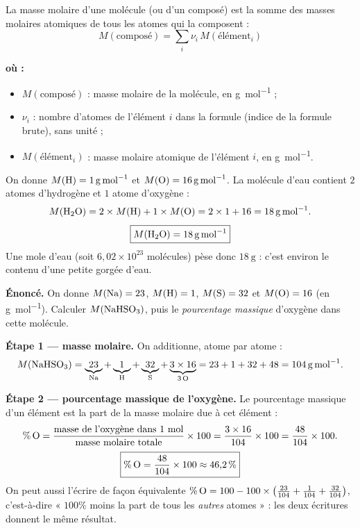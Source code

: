 \documentclass[11pt,a4paper]{article}
\newenvironment{ou}{%
  \par\smallskip\noindent\textbf{où :}\nopagebreak
  \begin{itemize}[leftmargin=1.8em,topsep=2pt,itemsep=1.5pt,parsep=0pt]}%
  {\end{itemize}}
\begin{document}
\begin{formule}
La masse molaire d'une molécule (ou d'un composé) est la somme des masses molaires atomiques de tous
les atomes qui la composent :
\[ \boxed{\,M(\text{composé}) = \sum_i \nu_i \, M(\text{élément}_i)\,} \]
\begin{ou}
  \item $M(\text{composé})$ : masse molaire de la molécule, en \si{\gram\per\mole} ;
  \item $\nu_i$ : nombre d'atomes de l'élément $i$ dans la formule (indice de la formule brute), sans unité ;
  \item $M(\text{élément}_i)$ : masse molaire atomique de l'élément $i$, en \si{\gram\per\mole}.
\end{ou}
\end{formule}

\begin{exemple}
On donne $M(\ce{H}) = \SI{1}{\gram\per\mole}$ et $M(\ce{O}) = \SI{16}{\gram\per\mole}$. La molécule
d'eau contient $2$ atomes d'hydrogène et $1$ atome d'oxygène :
\[ M(\ce{H2O}) = 2\times M(\ce{H}) + 1\times M(\ce{O}) = 2\times 1 + 16 = \SI{18}{\gram\per\mole}. \]
\[ \boxed{M(\ce{H2O}) = \SI{18}{\gram\per\mole}} \]
Une mole d'eau (soit $6{,}02\times10^{23}$ molécules) pèse donc $\SI{18}{\gram}$ : c'est environ le
contenu d'une petite gorgée d'eau.
\end{exemple}

\begin{exemple}
\textbf{Énoncé.} On donne $M(\ce{Na})=23$, $M(\ce{H})=1$, $M(\ce{S})=32$ et $M(\ce{O})=16$
(en \si{\gram\per\mole}). Calculer $M(\ce{NaHSO3})$, puis le \emph{pourcentage massique} d'oxygène
dans cette molécule.

\smallskip
\textbf{Étape 1 — masse molaire.} On additionne, atome par atome :
\[ M(\ce{NaHSO3}) = \underbrace{23}_{\ce{Na}} + \underbrace{1}_{\ce{H}} + \underbrace{32}_{\ce{S}}
   + \underbrace{3\times 16}_{3\,\ce{O}} = 23+1+32+48 = \SI{104}{\gram\per\mole}. \]

\textbf{Étape 2 — pourcentage massique de l'oxygène.} Le pourcentage massique d'un élément est la
part de la masse molaire due à cet élément :
\[ \%\,\ce{O} = \frac{\text{masse de l'oxygène dans 1 mol}}{\text{masse molaire totale}}\times 100
   = \frac{3\times 16}{104}\times 100 = \frac{48}{104}\times 100. \]
\[ \boxed{\%\,\ce{O} = \frac{48}{104}\times 100 \approx 46{,}2\,\%} \]
On peut aussi l'écrire de façon équivalente
$\%\,\ce{O} = 100 - 100\times\left(\frac{23}{104}+\frac{1}{104}+\frac{32}{104}\right)$, c'est-à-dire
« $100\%$ moins la part de tous les \emph{autres} atomes » : les deux écritures donnent le même résultat.
\end{exemple}
\end{document}
